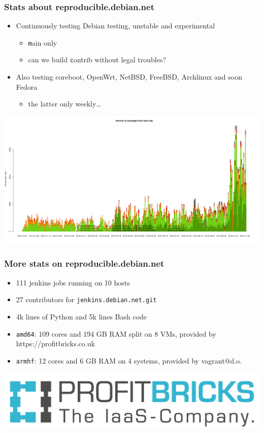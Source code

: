 \documentclass[14pt]{beamer}
\begin{document}
\begin{frame}
 \frametitle{Stats about reproducible.debian.net}

 \begin{itemize}
  \item Continuously testing Debian testing, unstable and experimental
   \begin{itemize}
    \item \small{ \texttt main only }
    \item \small{ can we build \texttt contrib without legal troubles? }
   \end{itemize}
  \item Also testing coreboot, OpenWrt, NetBSD, FreeBSD,
  Archlinux and soon Fedora
   \begin{itemize}
    \item \small{ the latter only weekly… }
   \end{itemize}
 \end{itemize}
 \vfill
 \begin{center}
  \includegraphics[height=0.4\paperheight]{images/stats_builds_per_day_amd64.png}
 \end{center}
\end{frame}


\begin{frame}
 \frametitle{More stats on reproducible.debian.net}

 \begin{itemize}
  \item 111 jenkins jobs running on 10 hosts
  \item 27 contributors for \texttt{jenkins.debian.net.git}
  \item 4k lines of Python and 5k lines Bash code
  \item \texttt{amd64}: 109 cores and 194 GB RAM split on 8 VMs, provided by
  https://profitbricks.co.uk
  \item \texttt{armhf}: 12 cores and 6 GB RAM on 4 systems, provided by vagrant@d.o.
 \end{itemize}
 \begin{center}
  \includegraphics[height=0.15\paperheight]{images/profitbricks_logo.png}
  \vfill
 \end{center}
\end{frame}
\end{document}
